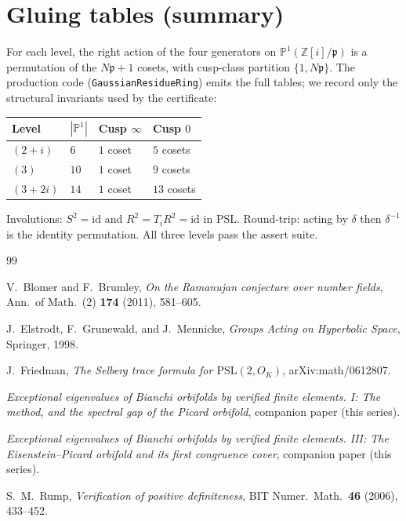 \documentclass[11pt]{amsart}
\newcommand{\ZZ}{\mathbb{Z}}
\newcommand{\PSL}{\mathrm{PSL}}
\newcommand{\p}{\mathfrak{p}}
\begin{document}
\section{Gluing tables (summary)}

For each level, the right action of the four generators on
$\mathbb{P}^1(\ZZ[i]/\p)$ is a permutation of the $N\p+1$ cosets, with
cusp-class partition $\{1,N\p\}$.  The production code
(\texttt{GaussianResidueRing}) emits the full tables; we record only the
structural invariants used by the certificate:

\begin{center}
\begin{tabular}{@{}llll@{}}
\toprule
Level & $|\mathbb{P}^1|$ & Cusp $\infty$ & Cusp $0$ \\
\midrule
$(2+i)$ & $6$ & $1$ coset & $5$ cosets \\
$(3)$ & $10$ & $1$ coset & $9$ cosets \\
$(3+2i)$ & $14$ & $1$ coset & $13$ cosets \\
\bottomrule
\end{tabular}
\end{center}

Involutions: $S^2=\mathrm{id}$ and $R^2=T_iR^2=\mathrm{id}$ in $\PSL$.
Round-trip: acting by $\delta$ then $\delta^{-1}$ is the identity
permutation.  All three levels pass the assert suite.

\begin{thebibliography}{99}

V.~Blomer and F.~Brumley,
\emph{On the Ramanujan conjecture over number fields},
Ann.\ of Math.\ (2) \textbf{174} (2011), 581--605.

J.~Elstrodt, F.~Grunewald, and J.~Mennicke,
\emph{Groups Acting on Hyperbolic Space},
Springer, 1998.

J.~Friedman,
\emph{The Selberg trace formula for $\mathrm{PSL}(2,O_K)$},
arXiv:math/0612807.

\emph{Exceptional eigenvalues of Bianchi orbifolds by verified finite
elements.  I: The method, and the spectral gap of the Picard orbifold},
companion paper (this series).

\emph{Exceptional eigenvalues of Bianchi orbifolds by verified finite
elements.  III: The Eisenstein--Picard orbifold and its first congruence
cover},
companion paper (this series).

S.~M.~Rump,
\emph{Verification of positive definiteness},
BIT Numer.\ Math.\ \textbf{46} (2006), 433--452.

\end{thebibliography}
\end{document}
